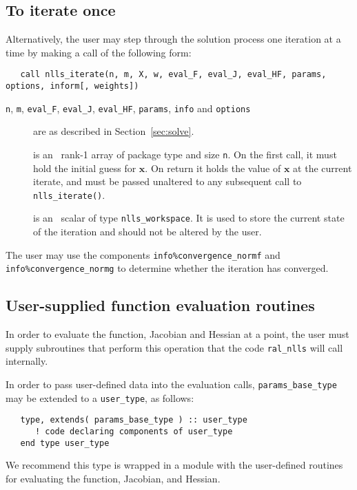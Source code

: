 \documentclass{spec}
\begin{document}
\subsection{To iterate once}
\label{sec:iterate}
Alternatively, the user may step through the solution process one iteration at
a time by making a call of the following form:

\begin{verbatim}
   call nlls_iterate(n, m, X, w, eval_F, eval_J, eval_HF, params, options, inform[, weights])
\end{verbatim}

\begin{description}

\item[\texttt{n}, \texttt{m}, \texttt{eval\_F}, \texttt{eval\_J}, \texttt{eval\_HF}, \texttt{params}, \texttt{info} and \texttt{options}] are as described in Section~\ref{sec:solve}.

 is an \intentinout\  rank-1 array of package type
and size {\tt n}.  On the first call, it must hold the initial guess for
$\bm x$. On return it holds the value of $\bm x$ at the current iterate, and
must be passed unaltered to any subsequent call to \texttt{nlls\_iterate()}.

 is an \intentinout\ scalar of type \texttt{nlls\_workspace}. It is used
to store the current state of the iteration and should not be altered by the
user.

\end{description}

The user may use the components \texttt{info\%convergence\_normf} and
\texttt{info\%convergence\_normg} to determine whether the iteration has
converged.

\subsection{User-supplied function evaluation routines}
\label{sec::function_eval}
In order to evaluate the function, Jacobian and Hessian at a point, the user
must supply subroutines that perform this operation that the code
{\tt ral\_nlls} will call internally.

In order to pass user-defined data into the evaluation calls, {\tt params\_base\_type} may be extended to a {\tt user\_type}, as follows:
\begin{verbatim}
   type, extends( params_base_type ) :: user_type
      ! code declaring components of user_type
   end type user_type
\end{verbatim}
We recommend this type is wrapped in a module with the user-defined routines
for evaluating the function, Jacobian, and Hessian.
\end{document}
